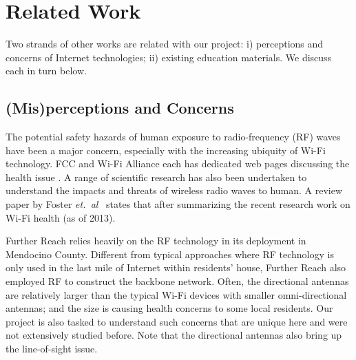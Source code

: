 \section{Related Work}
\label{sec:related-work}

Two strands of other works are related with our project: i) perceptions and
concerns of Internet technologies; ii) existing education materials. We discuss
each in turn below.

\subsection{(Mis)perceptions and Concerns}
\label{sec:conc-misp}

The potential safety hazards of human exposure to radio-frequency (RF) waves
have been a major concern, especially with the increasing ubiquity of Wi-Fi
technology. FCC and Wi-Fi Alliance each has dedicated web pages discussing the
health issue \cite{fcc2015radio, wifi2015health}. A range of scientific research
has also been undertaken to understand the impacts and threats of wireless radio
waves to human. A review paper by Foster {\em et.~al}~\cite{foster2013wi} states
that 
after summarizing the recent research work on Wi-Fi health (as of 2013).

Further Reach relies heavily on the RF technology in its deployment in Mendocino
County. Different from typical approaches where RF technology is only used in
the last mile of Internet within residents' house, Further Reach also employed
RF to construct the backbone network. Often, the directional antennas are
relatively larger than the typical Wi-Fi devices with smaller omni-directional
antennas; and the size is causing health concerns to some local residents. Our
project is also tasked to understand such concerns that are unique here and were
not extensively studied before. Note that the directional antennas also bring up
the line-of-sight issue.

